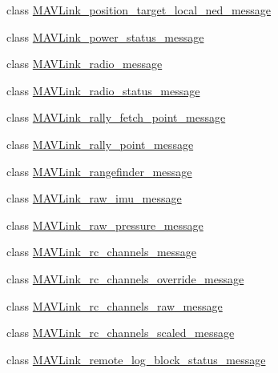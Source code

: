 \begin{DoxyCompactItemize}
\item 
class \hyperlink{classpymavlink_1_1dialects_1_1v10_1_1MAVLink__position__target__local__ned__message}{M\+A\+V\+Link\+\_\+position\+\_\+target\+\_\+local\+\_\+ned\+\_\+message}
\item 
class \hyperlink{classpymavlink_1_1dialects_1_1v10_1_1MAVLink__power__status__message}{M\+A\+V\+Link\+\_\+power\+\_\+status\+\_\+message}
\item 
class \hyperlink{classpymavlink_1_1dialects_1_1v10_1_1MAVLink__radio__message}{M\+A\+V\+Link\+\_\+radio\+\_\+message}
\item 
class \hyperlink{classpymavlink_1_1dialects_1_1v10_1_1MAVLink__radio__status__message}{M\+A\+V\+Link\+\_\+radio\+\_\+status\+\_\+message}
\item 
class \hyperlink{classpymavlink_1_1dialects_1_1v10_1_1MAVLink__rally__fetch__point__message}{M\+A\+V\+Link\+\_\+rally\+\_\+fetch\+\_\+point\+\_\+message}
\item 
class \hyperlink{classpymavlink_1_1dialects_1_1v10_1_1MAVLink__rally__point__message}{M\+A\+V\+Link\+\_\+rally\+\_\+point\+\_\+message}
\item 
class \hyperlink{classpymavlink_1_1dialects_1_1v10_1_1MAVLink__rangefinder__message}{M\+A\+V\+Link\+\_\+rangefinder\+\_\+message}
\item 
class \hyperlink{classpymavlink_1_1dialects_1_1v10_1_1MAVLink__raw__imu__message}{M\+A\+V\+Link\+\_\+raw\+\_\+imu\+\_\+message}
\item 
class \hyperlink{classpymavlink_1_1dialects_1_1v10_1_1MAVLink__raw__pressure__message}{M\+A\+V\+Link\+\_\+raw\+\_\+pressure\+\_\+message}
\item 
class \hyperlink{classpymavlink_1_1dialects_1_1v10_1_1MAVLink__rc__channels__message}{M\+A\+V\+Link\+\_\+rc\+\_\+channels\+\_\+message}
\item 
class \hyperlink{classpymavlink_1_1dialects_1_1v10_1_1MAVLink__rc__channels__override__message}{M\+A\+V\+Link\+\_\+rc\+\_\+channels\+\_\+override\+\_\+message}
\item 
class \hyperlink{classpymavlink_1_1dialects_1_1v10_1_1MAVLink__rc__channels__raw__message}{M\+A\+V\+Link\+\_\+rc\+\_\+channels\+\_\+raw\+\_\+message}
\item 
class \hyperlink{classpymavlink_1_1dialects_1_1v10_1_1MAVLink__rc__channels__scaled__message}{M\+A\+V\+Link\+\_\+rc\+\_\+channels\+\_\+scaled\+\_\+message}
\item 
class \hyperlink{classpymavlink_1_1dialects_1_1v10_1_1MAVLink__remote__log__block__status__message}{M\+A\+V\+Link\+\_\+remote\+\_\+log\+\_\+block\+\_\+status\+\_\+message}

\end{DoxyCompactItemize}
